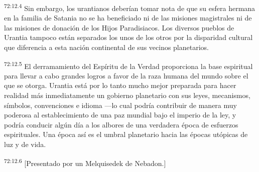 \par
\textsuperscript{72:12.4} Sin embargo, los urantianos deberían tomar nota de que su esfera hermana en la familia de Satania no se ha beneficiado ni de las misiones magistrales ni de las misiones de donación de los Hijos Paradisiacos. Los diversos pueblos de Urantia tampoco están separados los unos de los otros por la disparidad cultural que diferencia a esta nación continental de sus vecinos planetarios.

\par
\textsuperscript{72:12.5} El derramamiento del Espíritu de la Verdad proporciona la base espiritual para llevar a cabo grandes logros a favor de la raza humana del mundo sobre el que se otorga. Urantia está por lo tanto mucho mejor preparada para hacer realidad más inmediatamente un gobierno planetario con sus leyes, mecanismos, símbolos, convenciones e idioma ---lo cual podría contribuir de manera muy poderosa al establecimiento de una paz mundial bajo el imperio de la ley, y podría conducir algún día a los albores de una verdadera época de esfuerzos espirituales. Una época así es el umbral planetario hacia las épocas utópicas de luz y de vida.

\par
\textsuperscript{72:12.6} [Presentado por un Melquisedek de Nebadon.]